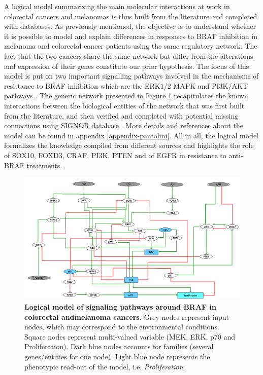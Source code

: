 \documentclass[a4paper,12pt,twoside,onecolumn,openright,final,oldfontcommands]{memoir}
\begin{document}
A logical model summarizing the main molecular interactions at work in
colorectal cancers and melanomas is thus built from the literature and
completed with databases. As previously mentioned, the objective is to
understand whether it is possible to model and explain differences in
responses to BRAF inhibition in melanoma and colorectal cancer patients
using the same regulatory network. The fact that the two cancers share
the same network but differ from the alterations and expression of their
genes constitute our prior hypothesis. The focus of this model is put on
two important signalling pathways involved in the mechanisms of
resistance to BRAF inhibition which are the ERK1/2 MAPK and PI3K/AKT
pathways \citep{ursem2018emerging, rossi2019drug}. The generic network
presented in Figure \ref{fig:BRAF-model} recapitulates the known
interactions between the biological entities of the network that was
first built from the literature, and then verified and completed with
potential missing connections using SIGNOR database
\citep{perfetto2016signor}. More details and references about the model
can be found in appendix \ref{appendix-pantolini}. All in all, the
logical model formalizes the knowledge compiled from different sources
and highlights the role of SOX10, FOXD3, CRAF, PI3K, PTEN and of EGFR in
resistance to anti-BRAF treatments.

\begin{figure}

{\centering \includegraphics[width=0.9\linewidth]{fig/BRAF-model} 

}

\caption[Bimodality criteria and their combinations]{\textbf{Logical model of signaling pathways
around BRAF in colorectal andmelanoma cancers.} Grey nodes represent
input nodes, which may correspond to the environmental conditions.
Square nodes represent multi-valued variable (MEK, ERK, p70 and
Proliferation). Dark blue nodes accounts for families (several
genes/entities for one node). Light blue node represents the phenotypic
read-out of the model, i.e. \emph{Proliferation}.}\label{fig:BRAF-model}
\end{figure}
\end{document}
